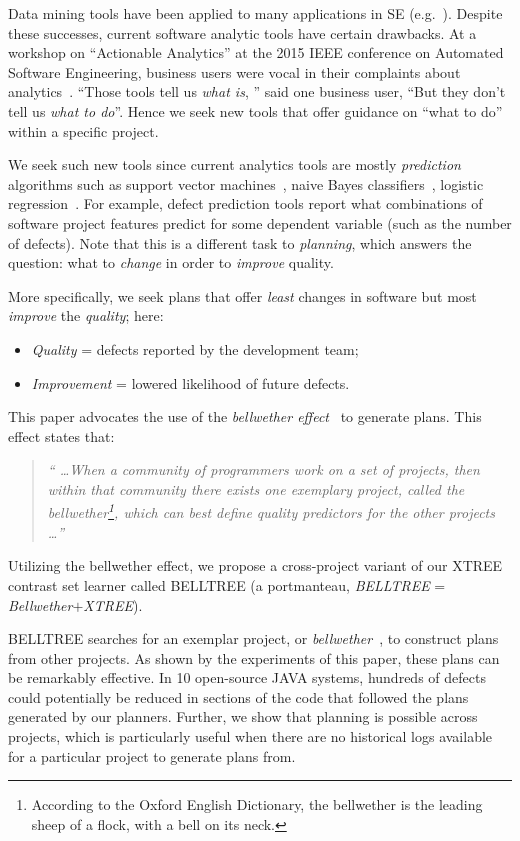 \documentclass[10pt, journal, compsoc]{IEEEtran}
\newcommand{\bi}{\begin{itemize}} %
\newcommand{\ei}{\end{itemize}}
\begin{document}
Data mining tools have been applied to many applications in SE (e.g.~\cite{czer11, ostrand04, Menzies2007a, turhan11, koc11b, export:208800, theisen15}). 
Despite these successes,  current
software analytic tools have certain drawbacks. At a workshop on ``Actionable Analytics'' at the 2015 IEEE conference on
Automated Software Engineering, 
business users were vocal in their complaints about analytics~\cite{hihn15}.
``Those tools tell us \textit{what is}, '' said one business user, ``But they don't tell us \textit{what to do}''.
Hence we seek new tools that offer  guidance on ``what to do'' within a specific project. 

We seek such new tools since  current   analytics tools are mostly \textit{prediction} algorithms such as support vector machines~\cite{cortes95}, naive Bayes classifiers~\cite{lessmann08}, logistic regression~\cite{lessmann08}. For example, defect prediction tools report what combinations of software project features predict for some dependent variable (such as the number of defects). Note that this is a different task to \textit{planning}, which answers the question: what to {\em change} in order to {\em improve} quality.
	
More specifically, we seek plans that offer {\em least} changes in software but most \textit{improve} the \textit{quality}; here:
\bi
\item \textit{Quality} = defects reported by the development team; 
\item \textit{Improvement} = lowered likelihood of future defects.
\ei
This paper advocates the use of the {\em bellwether effect}~\cite{krishna16, krishna17a, mensah2018investigating} to generate plans. This effect states that:
\begin{quote}
  \textit{`` \ldots When a community of programmers work on a set of projects, then within that community there exists one exemplary project, called the bellwether\footnote{According to the Oxford English Dictionary, the bellwether is the leading sheep of a flock, with a bell on its neck.}, which can best define quality predictors for the other projects \ldots ''}
\end{quote}
Utilizing the bellwether effect, we propose a cross-project variant of our XTREE contrast set learner called BELLTREE (a portmanteau,  \textit{BELLTREE} = \textit{Bellwether}$+$\textit{XTREE}). 

BELLTREE searches for an exemplar project, or \textit{bellwether}~\cite{krishna17a}, to construct plans from other projects. As shown by
the experiments of this paper, these plans can be remarkably effective. In 10 open-source JAVA systems, hundreds of defects could potentially be reduced in sections of the code that followed the plans generated by our planners. Further, we show that planning is possible across projects, which is particularly useful when there are no historical logs available for a particular project to generate plans from.
\end{document}
